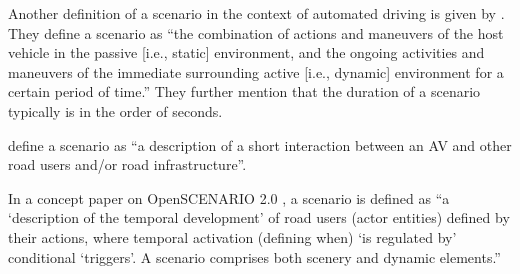 Another definition of a scenario in the context of automated driving is given by \textcite{elrofai2016scenario}. They define a scenario as ``the combination of actions and maneuvers of the host vehicle in the passive [i.e., static] environment, and the ongoing activities and maneuvers of the immediate surrounding active [i.e., dynamic] environment for a certain period of time.'' They further mention that the duration of a scenario typically is in the order of seconds.

\cstartb
\textcite{catapult2018regulating} define a scenario as ``a description of a short interaction between an AV and other road users and/or road infrastructure''. 

In a concept paper on OpenSCENARIO 2.0 \autocite{OpenSCENARIO2}, a scenario is defined as ``a `description of the temporal development' of road users (actor entities) defined by their actions, where temporal activation (defining when) `is regulated by' conditional `triggers'. A scenario comprises both scenery and dynamic elements.'' \cendb



